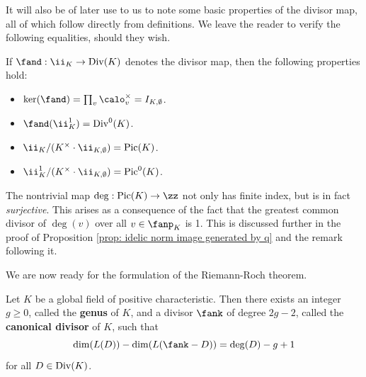 \documentclass[11pt, x11names, openany]{book}
\begin{document}
It will also be of later use to us to note some basic properties of the divisor map, all of which follow directly from definitions. We leave the reader to verify the following equalities, should they wish.
\begin{prop}
    \label{prop: properties of the divisor map}
    If $\fand: \ii_K \to \bigdiv(K)$ denotes the divisor map, then the following properties hold:
    \begin{itemize}
        \item $\ker(\fand) = \prod_v \calo_v^\times = I_{K, \emptyset}$.
        \item $\fand(\ii^1_K) = \bigdiv^0(K)$.
        \item $\ii_K/(K^\times \cdot \ii_{K, \emptyset}) = \pic(K)$.
        \item $\ii^1_K/(K^\times \cdot \ii_{K, \emptyset}) = \pic^0(K)$.
    \end{itemize}
\end{prop}


\begin{remark}
    The nontrivial map $\deg: \pic(K) \to \zz$ not only has finite index, but is in fact \textit{surjective}. This arises as a consequence of the fact that the greatest common divisor of $\deg(v)$ over all $v \in \fanp_K$ is 1. This is discussed further in the proof of Proposition \ref{prop: idelic norm image generated by q} and the remark following it.
\end{remark}


We are now ready for the formulation of the Riemann-Roch theorem.

\begin{theorem}
\label{thm: geometric riemann-roch}
    Let $K$ be a global field of positive characteristic. Then there exists an integer $g \geq 0$, called the \textbf{genus} of $K$, and a divisor $\fank$ of degree $2g-2$, called the \textbf{canonical divisor} of $K$, such that
    \begin{equation*}
        \dim(L(D)) - \dim(L(\fank-D)) = \deg(D) - g + 1
    \end{equation*}
    for all $D \in \operatorname{Div}(K)$.
\end{theorem}
\end{document}
